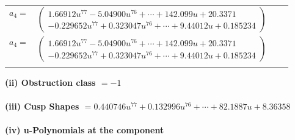 \documentclass[1p]{elsarticle_modified}
\theoremstyle{definition}
\begin{document}
\begin{tabular}{m{7pt} m{180pt} m{7pt} m{180pt} }
\flushright $a_{4}=$&$\begin{pmatrix}1.66912 u^{77}-5.04900 u^{76}+\cdots+142.099 u+20.3371\\-0.229652 u^{77}+0.323047 u^{76}+\cdots+9.44012 u+0.185234\end{pmatrix}$\\ \flushright $a_{4}=$&$\begin{pmatrix}1.66912 u^{77}-5.04900 u^{76}+\cdots+142.099 u+20.3371\\-0.229652 u^{77}+0.323047 u^{76}+\cdots+9.44012 u+0.185234\end{pmatrix}$\\&\end{tabular}
\flushleft \textbf{(ii) Obstruction class $= -1$}\\~\\
\flushleft \textbf{(iii) Cusp Shapes $= 0.440746 u^{77}+0.132996 u^{76}+\cdots+82.1887 u+8.36358$}\\~\\
\newpage\renewcommand{\arraystretch}{1}
\flushleft \textbf{(iv) u-Polynomials at the component}\newline \\
\end{document}
